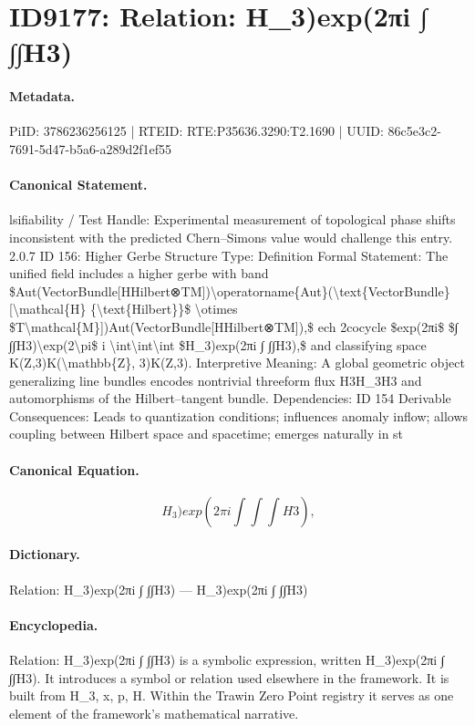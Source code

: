 \section*{ID9177: Relation: H\_3)exp(2πi ∫ ∫∫H3)}
\paragraph{Metadata.}
PiID: 3786236256125 | RTEID: RTE:P35636.3290:T2.1690 | UUID: 86c5e3c2-7691-5d47-b5a6-a289d2f1ef55

\paragraph{Canonical Statement.}
lsifiability / Test Handle: Experimental measurement of topological phase shifts inconsistent with the predicted Chern–Simons value would challenge this entry. 2.0.7 ID 156: Higher Gerbe Structure Type: Definition Formal Statement: The unified field includes a higher gerbe with band \$Aut(VectorBundle[HHilbert⊗TM])\textbackslash{}operatorname\{Aut\}(\textbackslash{}text\{VectorBundle\}[\textbackslash{}mathcal\{H\} \{\textbackslash{}text\{Hilbert\}\}\$ \textbackslash{}otimes \$T\textbackslash{}mathcal\{M\}])Aut(VectorBundle[HHilbert⊗TM]),\$ ech 2cocycle \$exp(2πi\$ \$∫ ∫∫H3)\textbackslash{}exp(2\textbackslash{}pi\$ i \textbackslash{}int\textbackslash{}int\textbackslash{}int \$H\_3)exp(2πi ∫ ∫∫H3),\$ and classifying space K(Z,3)K(\textbackslash{}mathbb\{Z\}, 3)K(Z,3). Interpretive Meaning: A global geometric object generalizing line bundles encodes nontrivial threeform flux H3H\_3H3 and automorphisms of the Hilbert–tangent bundle. Dependencies: ID 154 Derivable Consequences: Leads to quantization conditions; influences anomaly inflow; allows coupling between Hilbert space and spacetime; emerges naturally in st

\paragraph{Canonical Equation.}
\[
H_3)exp(2πi ∫ ∫∫H3),
\]

\paragraph{Dictionary.}
Relation: H\_3)exp(2πi ∫ ∫∫H3) — H\_3)exp(2πi ∫ ∫∫H3)

\paragraph{Encyclopedia.}
Relation: H\_3)exp(2πi ∫ ∫∫H3) is a symbolic expression, written H\_3)exp(2πi ∫ ∫∫H3). It introduces a symbol or relation used elsewhere in the framework. It is built from H\_3, x, p, H. Within the Trawin Zero Point registry it serves as one element of the framework's mathematical narrative.
